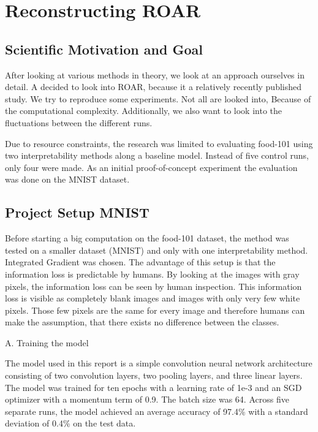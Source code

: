 
\chapter{Reconstructing ROAR} %
\label{sec:project}

\section{Scientific Motivation and Goal}


After looking at various methods in theory, we look at an approach ourselves in detail. A decided to look into ROAR\cite{hooker2019benchmark}, because it a relatively recently published study. We try to reproduce some experiments. Not all are looked into, Because of the computational complexity. Additionally, we also want to look into the fluctuations between the different runs.


Due to resource constraints, the research was limited to evaluating food-101 \cite{bossard14} using two interpretability methods along a baseline model. Instead of five control runs, only four were made. As an initial proof-of-concept experiment the evaluation was done on the MNIST dataset\cite{deng2012mnist}.

\section{Project Setup MNIST}

Before starting a big computation on the food-101 dataset, the method was tested on a smaller dataset (MNIST) and only with one interpretability method. Integrated Gradient was chosen. The advantage of this setup is that the information loss is predictable by humans. By looking at the images with gray pixels, the information loss can be seen by human inspection. This information loss is visible as completely blank images and images with only very few white pixels. Those few pixels are the same for every image and therefore humans can make the assumption, that there exists no difference between the classes.



A. Training the model

The model used in this report is a simple convolution neural network architecture consisting of two convolution layers, two pooling layers, and three linear layers. The model was trained for ten epochs with a learning rate of 1e-3 and an SGD optimizer with a momentum term of 0.9. The batch size was 64. Across five separate runs, the model achieved an average accuracy of 97.4\% with a standard deviation of 0.4\% on the test data. 


